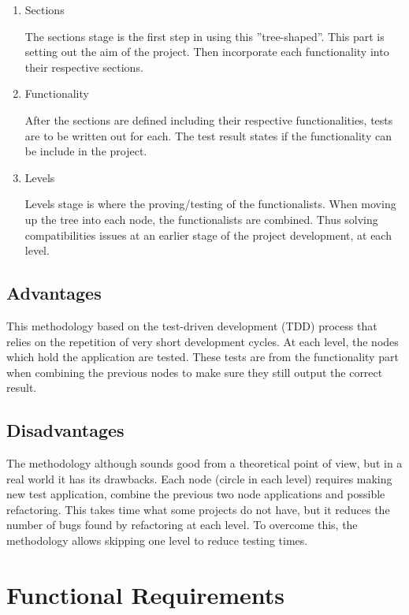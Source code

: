 \begin{enumerate}
  \item Sections
  
    The sections stage is the first step in using this ”tree-shaped”. This part is setting out the aim of the project. Then incorporate each functionality into their respective sections.
    
  \item Functionality   
    
    After the sections are defined including their respective functionalities, tests are to be written out for each. The test result states if the functionality can be include in the project.
    
  \item Levels
  
   Levels stage is where the proving/testing of the functionalists. When moving up the tree into each node, the functionalists are combined. Thus solving compatibilities issues at an earlier stage of the project development, at each level.
\end{enumerate}

\subsection{Advantages}

This methodology based on the test-driven development (TDD) process that relies on the repetition of very short development cycles. At each level, the nodes which hold the application are tested. These tests are from the functionality part when combining the previous nodes to make sure they still output the correct result.

\subsection{Disadvantages}

The methodology although sounds good from a theoretical point of view, but in a real world it has its drawbacks. Each node (circle in each level) requires making new test application, combine the previous two node applications and possible refactoring. This takes time what some projects do not have, but it reduces the number of bugs found by refactoring at each level. To overcome this, the methodology allows skipping one level to reduce testing times.

\section{Functional Requirements}


